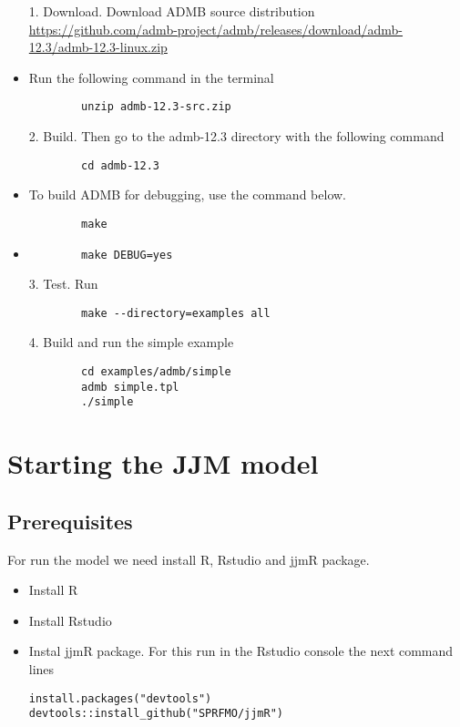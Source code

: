 \documentclass{article}
\begin{document}
\begin{itemize}
    \item[1.] Download.  Download ADMB source distribution \url{https://github.com/admb-project/admb/releases/download/admb-12.3/admb-12.3-linux.zip}
    \item Run the following command in the terminal
    \begin{lstlisting}
        unzip admb-12.3-src.zip
    \end{lstlisting}
    \item[2.] Build. Then go to the admb-12.3 directory with the following command
    \begin{lstlisting}
        cd admb-12.3
    \end{lstlisting}
    \item To build ADMB for debugging, use the command below.
    \begin{lstlisting}
        make
    \end{lstlisting}
    \item \begin{lstlisting}
        make DEBUG=yes
    \end{lstlisting}
    \item[3.] Test. Run
    \begin{lstlisting}
        make --directory=examples all
    \end{lstlisting}
    \item[4.] Build and run the simple example
    \begin{lstlisting}
        cd examples/admb/simple
        admb simple.tpl
        ./simple
    \end{lstlisting}
\end{itemize}






\section{Starting the JJM model}
\subsection{Prerequisites}

For run the model we need install R, Rstudio and jjmR package.

\begin{itemize}
    \item Install R
    \item Install Rstudio
        \item Instal jjmR package. For this run in the Rstudio console the next command lines
    \begin{lstlisting}
install.packages("devtools")
devtools::install_github("SPRFMO/jjmR")
    \end{lstlisting}
\end{itemize}
\end{document}
